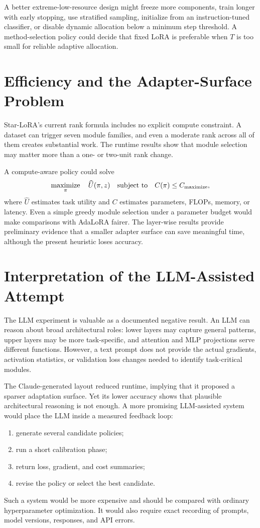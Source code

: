 A better extreme-low-resource design might freeze more components, train longer with early
stopping, use stratified sampling, initialize from an instruction-tuned classifier, or disable
dynamic allocation below a minimum step threshold. A method-selection policy could decide that
fixed LoRA is preferable when $T$ is too small for reliable adaptive allocation.

\section{Efficiency and the Adapter-Surface Problem}

Star-LoRA's current rank formula includes no explicit compute constraint. A dataset can trigger
seven module families, and even a moderate rank across all of them creates substantial work.
The runtime results show that module selection may matter more than a one- or two-unit rank change.

A compute-aware policy could solve
\begin{equation}
  \mathop{\rm maximize}_{\pi}\quad \widehat{U}(\pi,z)
  \quad \text{subject to}\quad
  C(\pi)\le C_{\max},
\end{equation}
where $\widehat{U}$ estimates task utility and $C$ estimates parameters, FLOPs, memory, or latency.
Even a simple greedy module selection under a parameter budget would make comparisons with
AdaLoRA fairer. The layer-wise results provide preliminary evidence that a smaller adapter surface
can save meaningful time, although the present heuristic loses accuracy.

\section{Interpretation of the LLM-Assisted Attempt}

The LLM experiment is valuable as a documented negative result. An LLM can reason about broad
architectural roles: lower layers may capture general patterns, upper layers may be more
task-specific, and attention and MLP projections serve different functions. However, a text prompt
does not provide the actual gradients, activation statistics, or validation loss changes needed to
identify task-critical modules.

The Claude-generated layout reduced runtime, implying that it proposed a sparser adaptation
surface. Yet its lower accuracy shows that plausible architectural reasoning is not enough.
A more promising LLM-assisted system would place the LLM inside a measured feedback loop:
\begin{enumerate}
  \item generate several candidate policies;
  \item run a short calibration phase;
  \item return loss, gradient, and cost summaries;
  \item revise the policy or select the best candidate.
\end{enumerate}
Such a system would be more expensive and should be compared with ordinary hyperparameter
optimization. It would also require exact recording of prompts, model versions, responses, and API
errors.

